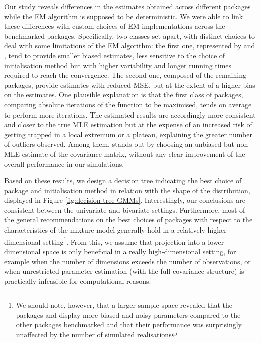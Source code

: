 Our study reveals differences in the estimates obtained across different packages while the EM algorithm is supposed to be deterministic. We were able to link these differences with custom choices of EM implementations across the benchmarked packages.
Specifically, two classes set apart, with distinct choices to deal with some limitations of the EM algorithm: the first
one, represented by  and , tend to provide
smaller biased estimates, less sensitive to the choice of initialisation
method but with higher variability and longer running times required to reach the convergence. The second one, composed of the remaining
packages, provide estimates with reduced MSE, but at the extent of a
higher bias on the estimates. One plausible explanation is that the first class of packages, comparing absolute iterations of the function to be maximised, tends on average to perform more iterations. The estimated results are accordingly more consistent and closer to the true MLE estimation but at the expense of an increased risk of getting trapped in a local extremum or a plateau, explaining the greater number of outliers observed. Among them,  stands out by choosing
an unbiased but non MLE-estimate of the covariance matrix, without any clear improvement
of the overall performance in our simulations.

Based on these results, we design a decision tree indicating the best choice of package and initialisation method in relation with the shape of the distribution, displayed in Figure \ref{fig:decision-tree-GMMs}. Interestingly, our conclusions are consistent between the univariate and bivariate settings. Furthermore, most of the general recommendations on the best choices of packages with respect to the characteristics of the mixture model generally hold in a relatively higher dimensional setting\footnote{We should note, however, that a larger sample space revealed that the packages  and  display more biased and noisy parameters compared to the other packages benchmarked and that their performance was surprisingly unaffected by the number of simulated realisations}. From this, we assume that projection into a lower-dimensional space is only beneficial in a really high-dimensional setting, for example when the number of dimensions exceeds the number of observations, or when unrestricted parameter estimation (with the full covariance structure) is practically infeasible for computational reasons.

